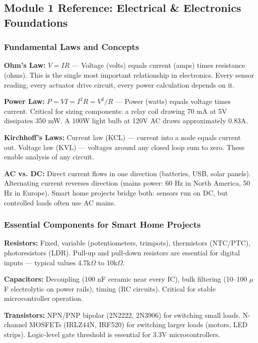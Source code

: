 \documentclass[11pt,letterpaper]{article}
\begin{document}
\subsection{Module 1 Reference: Electrical \& Electronics Foundations}

\subsubsection{Fundamental Laws and Concepts}

\textbf{Ohm's Law:} $V = IR$ --- Voltage (volts) equals current (amps) times resistance (ohms). This is the single most important relationship in electronics. Every sensor reading, every actuator drive circuit, every power calculation depends on it.

\textbf{Power Law:} $P = VI = I^2R = V^2/R$ --- Power (watts) equals voltage times current. Critical for sizing components: a relay coil drawing 70 mA at 5V dissipates 350 mW. A 100W light bulb at 120V AC draws approximately 0.83A.

\textbf{Kirchhoff's Laws:} Current law (KCL) --- current into a node equals current out. Voltage law (KVL) --- voltages around any closed loop sum to zero. These enable analysis of any circuit.

\textbf{AC vs. DC:} Direct current flows in one direction (batteries, USB, solar panels). Alternating current reverses direction (mains power: 60 Hz in North America, 50 Hz in Europe). Smart home projects bridge both: sensors run on DC, but controlled loads often use AC mains.

\subsubsection{Essential Components for Smart Home Projects}

\textbf{Resistors:} Fixed, variable (potentiometers, trimpots), thermistors (NTC/PTC), photoresistors (LDR). Pull-up and pull-down resistors are essential for digital inputs --- typical values 4.7k$\Omega$ to 10k$\Omega$.

\textbf{Capacitors:} Decoupling (100 nF ceramic near every IC), bulk filtering (10--100 $\mu$F electrolytic on power rails), timing (RC circuits). Critical for stable microcontroller operation.

\textbf{Transistors:} NPN/PNP bipolar (2N2222, 2N3906) for switching small loads. N-channel MOSFETs (IRLZ44N, IRF520) for switching larger loads (motors, LED strips). Logic-level gate threshold is essential for 3.3V microcontrollers.
\end{document}
